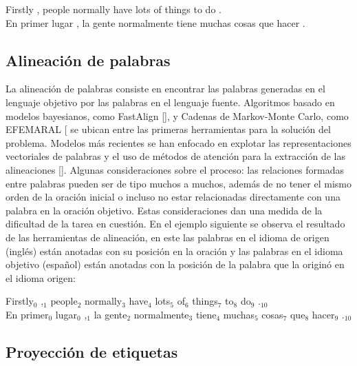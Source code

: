 \begin{adjustwidth}{25pt}{25pt}
	Firstly , people normally have lots of things to do . \\
	En primer lugar , la gente normalmente tiene muchas cosas que hacer .
\end{adjustwidth}

\subsection{Alineación de palabras}

La alineación de palabras consiste en encontrar las palabras generadas en el lenguaje objetivo por las 
palabras en el lenguaje fuente.
Algoritmos basado en modelos bayesianos, como FastAlign [\cite{dyer2013fastalign}], 
y Cadenas de Markov-Monte Carlo, como EFEMARAL [\cite{ostling2016efficient} se ubican entre
las primeras herramientas para la solución del problema. 
Modelos más recientes se han enfocado en explotar las representaciones
vectoriales de palabras y el uso de métodos de atención para la extracción de las
alineaciones [\cite{dou2021word}]. Algunas consideraciones sobre el proceso: las relaciones 
formadas entre palabras pueden ser de tipo muchos a muchos, además de no tener el mismo orden de la 
oración inicial o incluso no estar relacionadas directamente con una palabra en la oración objetivo.
Estas consideraciones dan una medida de la dificultad de la tarea en cuestión.
En el ejemplo siguiente se observa el resultado de las herramientas de alineación, en este 
las palabras en el idioma de origen (inglés) están anotadas con su posición en la oración y 
las palabras en el idioma objetivo (español) están anotadas con la posición de la palabra que 
la originó en el idioma origen:

\begin{adjustwidth}{25pt}{25pt}
	Firstly$_0$ ,$_1$ people$_2$ normally$_3$ have$_4$ lots$_5$ of$_6$ things$_7$ to$_8$ do$_9$ .$_{10}$ \\
	En primer$_0$ lugar$_0$ ,$_1$ la gente$_2$ normalmente$_3$ tiene$_4$ muchas$_5$ cosas$_7$ que$_8$ hacer$_9$ .$_{10}$
\end{adjustwidth}

\subsection{Proyección de etiquetas}

